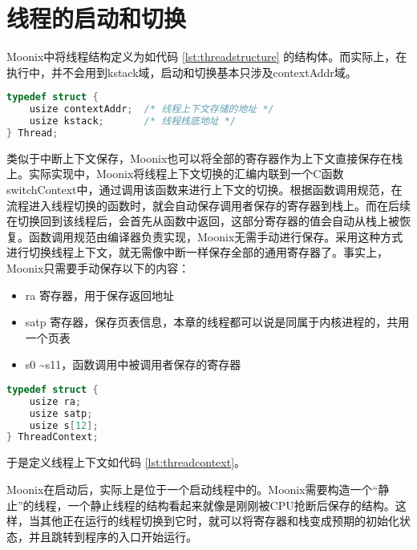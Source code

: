 \section{线程的启动和切换}

Moonix中将线程结构定义为如代码 \ref{lst:threadstructure} 的结构体。而实际上，在执行中，并不会用到kstack域，启动和切换基本只涉及contextAddr域。

\begin{minipage}[c]{0.95\textwidth}
\begin{lstlisting}[language={C}, caption={线程结构定义}, label={lst:threadstructure}]
typedef struct {
	usize contextAddr;  /* 线程上下文存储的地址 */
	usize kstack;       /* 线程栈底地址 */
} Thread;
\end{lstlisting}
\end{minipage}

类似于中断上下文保存，Moonix也可以将全部的寄存器作为上下文直接保存在栈上。实际实现中，Moonix将线程上下文切换的汇编内联到一个C函数switchContext中，通过调用该函数来进行上下文的切换。根据函数调用规范，在流程进入线程切换的函数时，就会自动保存调用者保存的寄存器到栈上。而在后续在切换回到该线程后，会首先从函数中返回，这部分寄存器的值会自动从栈上被恢复。函数调用规范由编译器负责实现，Moonix无需手动进行保存。采用这种方式进行切换线程上下文，就无需像中断一样保存全部的通用寄存器了。事实上，Moonix只需要手动保存以下的内容：

\begin{itemize}
	\item ra 寄存器，用于保存返回地址
	\item satp 寄存器，保存页表信息，本章的线程都可以说是同属于内核进程的，共用一个页表
	\item s0 \textasciitilde s11，函数调用中被调用者保存的寄存器
\end{itemize}

\begin{minipage}[c]{0.95\textwidth}
\begin{lstlisting}[language={C}, caption={线程上下文定义}, label={lst:threadcontext}]
typedef struct {
	usize ra;
	usize satp;
	usize s[12];
} ThreadContext;
\end{lstlisting}
\end{minipage}

于是定义线程上下文如代码 \ref{lst:threadcontext}。

Moonix在启动后，实际上是位于一个启动线程中的。Moonix需要构造一个“静止”的线程，一个静止线程的结构看起来就像是刚刚被CPU抢断后保存的结构。这样，当其他正在运行的线程切换到它时，就可以将寄存器和栈变成预期的初始化状态，并且跳转到程序的入口开始运行。

